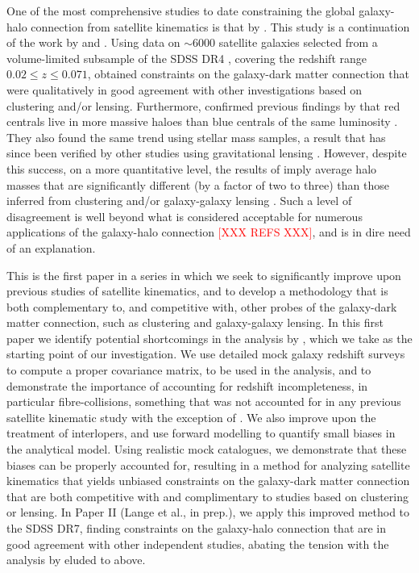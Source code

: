 \documentclass[fleqn,usenatbib,useAMS]{mnras}
\begin{document}
	One of the most comprehensive studies to date constraining the global galaxy-halo connection from satellite kinematics is that by \cite{More+11}. This study is a continuation of the work by \cite{vdBosch+04} and \cite{More+09b, More+09a}. Using data on $\sim 6000$ satellite galaxies selected from a volume-limited subsample of the SDSS DR4 \citep[][]{Adelman-McCarthy+06}, covering the redshift range $0.02 \leq z \leq 0.071$, \cite{More+11} obtained constraints on the galaxy-dark matter connection that were qualitatively in good agreement with other investigations based on  clustering and/or lensing. Furthermore, \cite{More+11} confirmed previous findings by \cite{Conroy+07} that red centrals live in more massive haloes than blue centrals of the same luminosity \citep[also see][for splits by morphological type]{Norberg+08}. They also found the same trend using stellar mass samples, a result that has since been verified by other studies using gravitational lensing \citep{Velander+14, Mandelbaum+16, Zu+16}. However, despite this success, on a more quantitative level, the results of \cite{More+11} imply average halo masses that are significantly different (by a factor of two to three) than those inferred from clustering and/or galaxy-galaxy lensing \citep[see e.g.,][]{Dutton+10, Leauthaud+12, Mandelbaum+16}. Such a level of disagreement is well beyond what is considered acceptable for numerous applications of the galaxy-halo connection \textcolor{red}{[XXX REFS XXX]}, and is in dire need of an explanation. 
	
	This is the first paper in a series in which we seek to significantly improve upon previous studies of satellite kinematics, and to develop a methodology that is both complementary to, and competitive with, other probes of the galaxy-dark matter connection, such as clustering and galaxy-galaxy lensing. In this first paper we identify potential shortcomings in the analysis by  \cite{More+09b, More+09a, More+11}, which we take as the starting point of our investigation. We use detailed mock galaxy redshift surveys to compute a proper covariance matrix, to be used in the analysis, and to demonstrate the importance of accounting for redshift incompleteness, in particular fibre-collisions, something that was not accounted for in any previous satellite kinematic study with the exception of \cite{Wojtak+13}. We also improve upon the treatment of interlopers, and use forward modelling to quantify small biases in the analytical model. Using realistic mock catalogues, we demonstrate that these biases can be properly accounted for, resulting in a method for analyzing satellite kinematics that yields unbiased constraints on the galaxy-dark matter connection that are both competitive with and complimentary to studies based on clustering or lensing. In Paper II (Lange et al., in prep.), we apply this improved method to the SDSS DR7, finding constraints on the galaxy-halo connection that are in good agreement with other independent studies, abating the tension with the analysis by \cite{More+11} eluded to above. 
	
\end{document}
